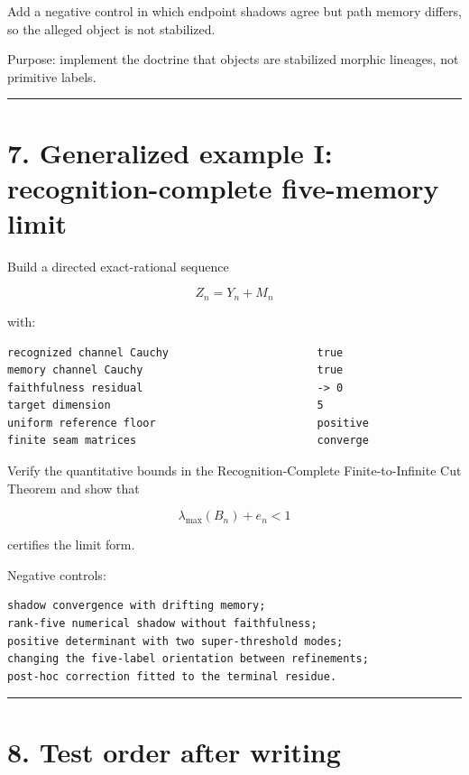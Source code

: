 Add a negative control in which endpoint shadows agree but path memory differs,
so the alleged object is not stabilized.

Purpose: implement the doctrine that objects are stabilized morphic lineages,
not primitive labels.

\begin{center}\rule{0.5\linewidth}{0.5pt}\end{center}

\hypertarget{generalized-example-i-recognition-complete-five-memory-limit}{%
\section{7. Generalized example I: recognition-complete five-memory limit}\label{generalized-example-i-recognition-complete-five-memory-limit}}

Build a directed exact-rational sequence

\[
Z_n=Y_n+M_n
\]

with:

\begin{verbatim}
recognized channel Cauchy                       true
memory channel Cauchy                           true
faithfulness residual                           -> 0
target dimension                                5
uniform reference floor                         positive
finite seam matrices                            converge
\end{verbatim}

Verify the quantitative bounds in the Recognition-Complete Finite-to-Infinite
Cut Theorem and show that

\[
\lambda_{\max}(B_n)+e_n<1
\]

certifies the limit form.

Negative controls:

\begin{verbatim}
shadow convergence with drifting memory;
rank-five numerical shadow without faithfulness;
positive determinant with two super-threshold modes;
changing the five-label orientation between refinements;
post-hoc correction fitted to the terminal residue.
\end{verbatim}

\begin{center}\rule{0.5\linewidth}{0.5pt}\end{center}

\hypertarget{test-order-after-writing}{%
\section{8. Test order after writing}\label{test-order-after-writing}}

